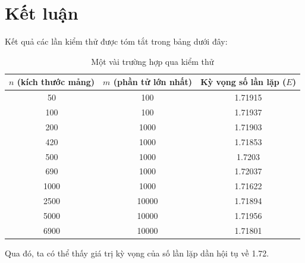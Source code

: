 \documentclass[12pt]{article}
\begin{document}
\section{Kết luận}
Kết quả các lần kiểm thử được tóm tắt trong bảng dưới đây:
\begin{table}[H]
\centering
\begin{tabular}{|c|c|c|}
    \hline
    $n$ (kích thước mảng) & $m$ (phần tử lớn nhất) & Kỳ vọng số lần lặp ($E$)  \\
    \hline
    50 & 100 & 1.71915\\
    100 & 100 & 1.71937\\
    200 & 1000 & 1.71903\\
    420 & 1000 & 1.71853\\
    500 & 1000 & 1.7203\\
    690 & 1000 & 1.72037\\
    1000 & 1000 & 1.71622\\
    2500 & 10000 & 1.71894\\
    5000 & 10000 & 1.71956\\
    6900 & 10000 & 1.71801\\
    \hline
\end{tabular}
\caption{Một vài trường hợp qua kiểm thử}
\end{table}
Qua đó, ta có thể thấy giá trị kỳ vọng của số lần lặp dần hội tụ về 1.72.
\end{document}
